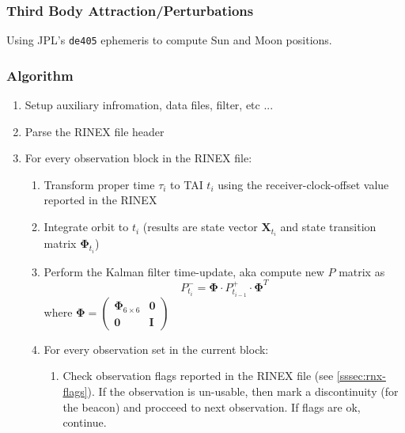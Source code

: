 \subsubsection{Third Body Attraction/Perturbations}
Using JPL's \texttt{de405} ephemeris to compute Sun and Moon positions.

\subsubsection{Algorithm}
\begin{enumerate}
  \item Setup auxiliary infromation, data files, filter, etc ...

  \item Parse the RINEX file header

  \item For every observation block in the RINEX file:
    \begin{enumerate}
      \item Transform proper time $\tau _i$ to TAI $t_i$ using the receiver-clock-offset 
        value reported in the RINEX
      \item Integrate orbit to $t_i$ (results are state vector $\bm{X}_{t_i}$ and state 
        transition matrix $\bm{\Phi}_{t_i}$)
      \item Perform the Kalman filter time-update, aka compute new $P$ matrix as 
        \begin{equation}
          P^- _{t_i} = \bm{\Phi} \cdot P^+ _{t_{i-1}} \cdot \bm{\Phi}^T
        \end{equation}
        where $\bm{\Phi} = \begin{pmatrix} \bm{\Phi}_{6\times 6} & \bm{0} \\ \bm{0} & \bm{I} \end{pmatrix}$
        \item For every observation set in the current block:
          \begin{enumerate}
            \item Check observation flags reported in the RINEX file (see \ref{sssec:rnx-flags}). 
              If the observation is un-usable, then mark a discontinuity (for the beacon) and procceed 
              to next observation. If flags are ok, continue.
          \end{enumerate}
      \end{enumerate}
\end{enumerate}
